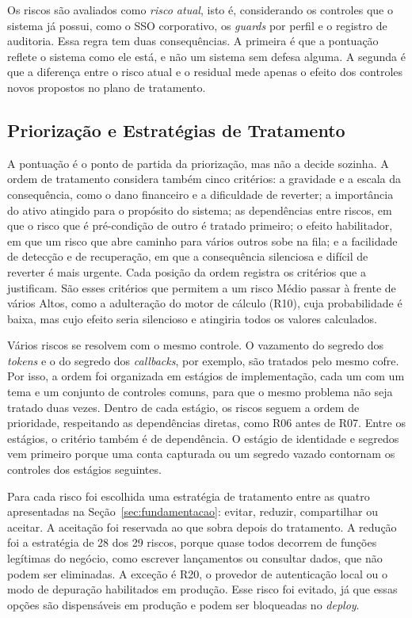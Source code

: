 \documentclass[conference]{IEEEtran}
\begin{document}
Os riscos são avaliados como \emph{risco atual}, isto é, considerando os controles que o sistema já possui, como o SSO corporativo, os \textit{guards} por perfil e o registro de auditoria. Essa regra tem duas consequências. A primeira é que a pontuação reflete o sistema como ele está, e não um sistema sem defesa alguma. A segunda é que a diferença entre o risco atual e o residual mede apenas o efeito dos controles novos propostos no plano de tratamento.

\subsection{Priorização e Estratégias de Tratamento}
\label{subsec:priorizacao}

A pontuação é o ponto de partida da priorização, mas não a decide sozinha. A ordem de tratamento considera também cinco critérios: a gravidade e a escala da consequência, como o dano financeiro e a dificuldade de reverter; a importância do ativo atingido para o propósito do sistema; as dependências entre riscos, em que o risco que é pré-condição de outro é tratado primeiro; o efeito habilitador, em que um risco que abre caminho para vários outros sobe na fila; e a facilidade de detecção e de recuperação, em que a consequência silenciosa e difícil de reverter é mais urgente. Cada posição da ordem registra os critérios que a justificam. São esses critérios que permitem a um risco Médio passar à frente de vários Altos, como a adulteração do motor de cálculo (R10), cuja probabilidade é baixa, mas cujo efeito seria silencioso e atingiria todos os valores calculados.

Vários riscos se resolvem com o mesmo controle. O vazamento do segredo dos \textit{tokens} e o do segredo dos \textit{callbacks}, por exemplo, são tratados pelo mesmo cofre. Por isso, a ordem foi organizada em estágios de implementação, cada um com um tema e um conjunto de controles comuns, para que o mesmo problema não seja tratado duas vezes. Dentro de cada estágio, os riscos seguem a ordem de prioridade, respeitando as dependências diretas, como R06 antes de R07. Entre os estágios, o critério também é de dependência. O estágio de identidade e segredos vem primeiro porque uma conta capturada ou um segredo vazado contornam os controles dos estágios seguintes.

Para cada risco foi escolhida uma estratégia de tratamento entre as quatro apresentadas na Seção~\ref{sec:fundamentacao}: evitar, reduzir, compartilhar ou aceitar. A aceitação foi reservada ao que sobra depois do tratamento. A redução foi a estratégia de 28 dos 29 riscos, porque quase todos decorrem de funções legítimas do negócio, como escrever lançamentos ou consultar dados, que não podem ser eliminadas. A exceção é R20, o provedor de autenticação local ou o modo de depuração habilitados em produção. Esse risco foi evitado, já que essas opções são dispensáveis em produção e podem ser bloqueadas no \textit{deploy}.
\end{document}
